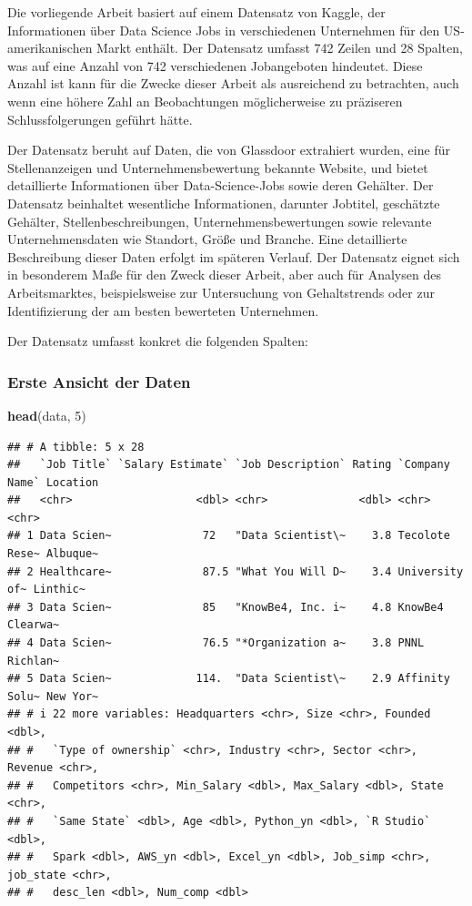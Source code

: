 \documentclass[
]{article}
\newenvironment{Shaded}{\begin{snugshade}}{\end{snugshade}}
\newcommand{\DecValTok}[1]{\textcolor[rgb]{0.00,0.00,0.81}{#1}}
\newcommand{\FunctionTok}[1]{\textcolor[rgb]{0.13,0.29,0.53}{\textbf{#1}}}
\newcommand{\NormalTok}[1]{#1}
\begin{document}
Die vorliegende Arbeit basiert auf einem Datensatz von Kaggle, der
Informationen über Data Science Jobs in verschiedenen Unternehmen für
den US-amerikanischen Markt enthält. Der Datensatz umfasst 742 Zeilen
und 28 Spalten, was auf eine Anzahl von 742 verschiedenen Jobangeboten
hindeutet. Diese Anzahl ist kann für die Zwecke dieser Arbeit als
ausreichend zu betrachten, auch wenn eine höhere Zahl an Beobachtungen
möglicherweise zu präziseren Schlussfolgerungen geführt hätte.

Der Datensatz beruht auf Daten, die von Glassdoor extrahiert wurden,
eine für Stellenanzeigen und Unternehmensbewertung bekannte Website, und
bietet detaillierte Informationen über Data-Science-Jobs sowie deren
Gehälter. Der Datensatz beinhaltet wesentliche Informationen, darunter
Jobtitel, geschätzte Gehälter, Stellenbeschreibungen,
Unternehmensbewertungen sowie relevante Unternehmensdaten wie Standort,
Größe und Branche. Eine detaillierte Beschreibung dieser Daten erfolgt
im späteren Verlauf. Der Datensatz eignet sich in besonderem Maße für
den Zweck dieser Arbeit, aber auch für Analysen des Arbeitsmarktes,
beispielsweise zur Untersuchung von Gehaltstrends oder zur
Identifizierung der am besten bewerteten Unternehmen.

Der Datensatz umfasst konkret die folgenden Spalten:

\subsubsection{Erste Ansicht der Daten}\label{erste-ansicht-der-daten}

\begin{Shaded}
\begin{Highlighting}[]
\FunctionTok{head}\NormalTok{(data, }\DecValTok{5}\NormalTok{)}
\end{Highlighting}
\end{Shaded}

\begin{verbatim}
## # A tibble: 5 x 28
##   `Job Title` `Salary Estimate` `Job Description` Rating `Company Name` Location
##   <chr>                   <dbl> <chr>              <dbl> <chr>          <chr>   
## 1 Data Scien~              72   "Data Scientist\~    3.8 Tecolote Rese~ Albuque~
## 2 Healthcare~              87.5 "What You Will D~    3.4 University of~ Linthic~
## 3 Data Scien~              85   "KnowBe4, Inc. i~    4.8 KnowBe4        Clearwa~
## 4 Data Scien~              76.5 "*Organization a~    3.8 PNNL           Richlan~
## 5 Data Scien~             114.  "Data Scientist\~    2.9 Affinity Solu~ New Yor~
## # i 22 more variables: Headquarters <chr>, Size <chr>, Founded <dbl>,
## #   `Type of ownership` <chr>, Industry <chr>, Sector <chr>, Revenue <chr>,
## #   Competitors <chr>, Min_Salary <dbl>, Max_Salary <dbl>, State <chr>,
## #   `Same State` <dbl>, Age <dbl>, Python_yn <dbl>, `R Studio` <dbl>,
## #   Spark <dbl>, AWS_yn <dbl>, Excel_yn <dbl>, Job_simp <chr>, job_state <chr>,
## #   desc_len <dbl>, Num_comp <dbl>
\end{verbatim}
\end{document}
